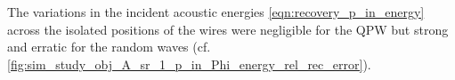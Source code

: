 The variations in
the incident acoustic energies
\eqref{eqn:recovery_p_in_energy} across
the isolated positions of
the wires were negligible for
the \ac{QPW} but
strong and
erratic for
the random waves
(cf. \cref{fig:sim_study_obj_A_sr_1_p_in_Phi_energy_rel_rec_error}).
